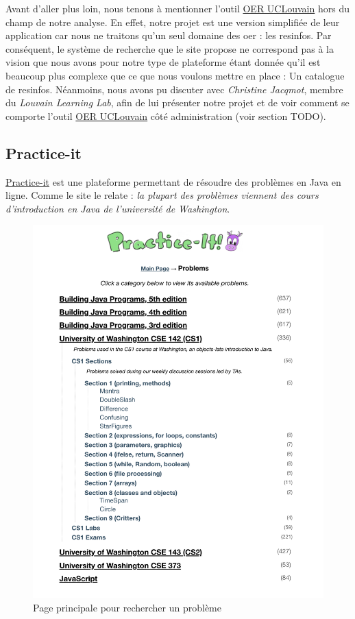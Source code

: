 Avant d'aller plus loin, nous tenons à mentionner l'outil \href{https://oer.uclouvain.be/}{OER UCLouvain} hors du champ de notre analyse. En effet, notre projet est une version simplifiée de leur application car nous ne traitons qu'un seul domaine des \gls{oer} : les \glspl{resinfo}. Par conséquent, le système de recherche que le site propose ne correspond pas à la vision que nous avons pour notre type de plateforme étant donnée qu'il est beaucoup plus complexe que ce que nous voulons mettre en place : Un catalogue de \glspl{resinfo}. Néanmoins, nous avons pu discuter avec \textit{Christine Jacqmot}, membre du \textit{Louvain Learning Lab}, afin de lui présenter notre projet et de voir comment se comporte l'outil \href{https://oer.uclouvain.be/}{OER UCLouvain} côté administration (voir section TODO).

\pagebreak
\subsection*{Practice-it}

\href{https://practiceit.cs.washington.edu/problem/list}{Practice-it} est une plateforme permettant de résoudre des problèmes en Java en ligne. Comme le site le relate : \textit{la plupart des problèmes viennent des cours d'introduction en Java de l'université de Washington}.

\begin{figure}[H]
    \includegraphics[width=\textwidth,height=0.6\textheight,keepaspectratio]{images/comparison/practice-it-1.png}
    \centering
    \caption[Practice-it : page principale pour rechercher un problème]{Page principale pour rechercher un problème}
\end{figure}

